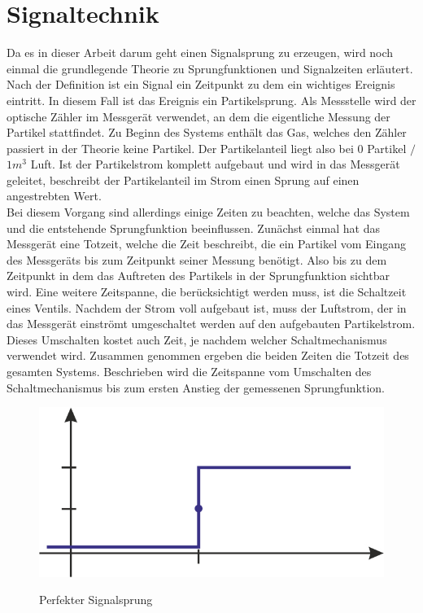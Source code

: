 \section{Signaltechnik}
Da es in dieser Arbeit darum geht einen Signalsprung zu erzeugen, wird noch einmal die grundlegende Theorie zu Sprungfunktionen und Signalzeiten erl\"{a}utert. Nach der Definition ist ein Signal ein Zeitpunkt zu dem ein wichtiges Ereignis eintritt. In diesem Fall ist das Ereignis ein Partikelsprung. Als Messstelle wird der optische Z\"{a}hler im Messger\"{a}t verwendet, an dem die eigentliche Messung der Partikel stattfindet. Zu Beginn des Systems enth\"{a}lt das Gas, welches den Z\"{a}hler passiert in der Theorie keine Partikel. Der Partikelanteil liegt also bei \(0\) Partikel \(/\) \(1m^3\) Luft. Ist der Partikelstrom komplett aufgebaut und wird in das Messger\"{a}t geleitet, beschreibt der Partikelanteil im Strom einen Sprung auf einen angestrebten Wert.
\\
Bei diesem Vorgang sind allerdings einige Zeiten zu beachten, welche das System und die entstehende Sprungfunktion beeinflussen. Zun\"{a}chst einmal hat das Messger\"{a}t eine Totzeit, welche die Zeit beschreibt, die ein Partikel vom Eingang des Messger\"{a}ts bis zum Zeitpunkt seiner Messung ben\"{o}tigt. Also bis zu dem Zeitpunkt in dem das Auftreten des Partikels in der Sprungfunktion sichtbar wird. Eine weitere Zeitspanne, die ber\"{u}cksichtigt werden muss, ist die Schaltzeit eines Ventils. Nachdem der Strom voll aufgebaut ist, muss der Luftstrom, der in das Messger\"{a}t einstr\"{o}mt umgeschaltet werden auf den aufgebauten Partikelstrom. Dieses Umschalten kostet auch Zeit, je nachdem welcher Schaltmechanismus verwendet wird. Zusammen genommen ergeben die beiden Zeiten die Totzeit des gesamten Systems. Beschrieben wird die Zeitspanne vom Umschalten des Schaltmechanismus bis zum ersten Anstieg der gemessenen Sprungfunktion.
\begin{figure}[H]
        \myfloatalign
        {\includegraphics[width=.7\linewidth]{gfx/fundamentals/jump.jpg}} \quad
        \caption[Perfekter Signalsprung]
        {Perfekter Signalsprung}
        \label{fig:sprung}
\end{figure}